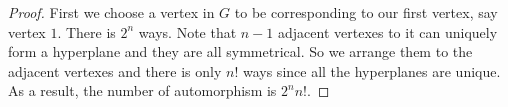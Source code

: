 
\begin{proof}

First we choose a vertex in $G$ to be corresponding to our first vertex, say vertex $1$. There is $2^n$ ways. Note that $n-1$ adjacent vertexes to it can uniquely form a hyperplane and they are all symmetrical. So we arrange them to the adjacent vertexes and there is only $n!$ ways since all the hyperplanes are unique.
As a result, the number of automorphism is $2^nn!$.
\end{proof}